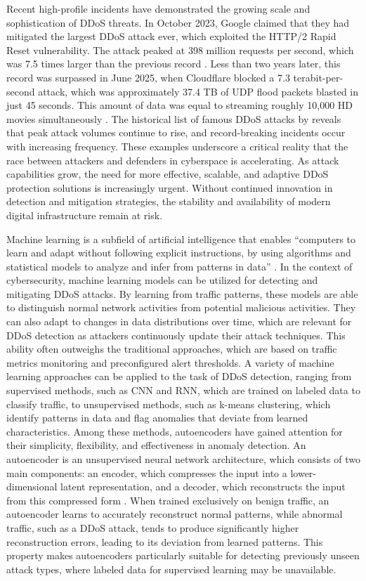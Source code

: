 Recent high-profile incidents have demonstrated the growing scale and sophistication of DDoS threats. In October 2023, Google claimed that they had mitigated the largest DDoS attack ever, which exploited the HTTP/2 Rapid Reset vulnerability. The attack peaked at 398 million requests per second, which was 7.5 times larger than the previous record \citep{google-398-mil}. Less than two years later, this record was surpassed in June 2025, when Cloudflare blocked a 7.3 terabit-per-second attack, which was approximately 37.4 TB of UDP flood packets blasted in just 45 seconds. This amount of data was equal to streaming roughly 10,000 HD movies simultaneously \citep{cloudflare-7-3-tbps}. The historical list of famous DDoS attacks by \cite{cloudflare-ddos-list} reveals that peak attack volumes continue to rise, and record-breaking incidents occur with increasing frequency. These examples underscore a critical reality that the race between attackers and defenders in cyberspace is accelerating. As attack capabilities grow, the need for more effective, scalable, and adaptive DDoS protection solutions is increasingly urgent. Without continued innovation in detection and mitigation strategies, the stability and availability of modern digital infrastructure remain at risk.

Machine learning is a subfield of artificial intelligence that enables “computers to learn and adapt without following explicit instructions, by using algorithms and statistical models to analyze and infer from patterns in data” \citep{oed-machine-learning}. In the context of cybersecurity, machine learning models can be utilized for detecting and mitigating DDoS attacks. By learning from traffic patterns, these models are able to distinguish normal network activities from potential malicious activities. They can also adapt to changes in data distributions over time, which are relevant for DDoS detection as attackers continuously update their attack techniques. This ability often outweighs the traditional approaches, which are based on traffic metrics monitoring and preconfigured alert thresholds. A variety of machine learning approaches can be applied to the task of DDoS detection, ranging from supervised methods, such as CNN and RNN, which are trained on labeled data to classify traffic, to unsupervised methods, such as k-means clustering, which identify patterns in data and flag anomalies that deviate from learned characteristics. Among these methods, autoencoders have gained attention for their simplicity, flexibility, and effectiveness in anomaly detection. An autoencoder is an unsupervised neural network architecture, which consists of two main components: an encoder, which compresses the input into a lower-dimensional latent representation, and a decoder, which reconstructs the input from this compressed form \citep{michelucci2022introductionautoencoders}. When trained exclusively on benign traffic, an autoencoder learns to accurately reconstruct normal patterns, while abnormal traffic, such as a DDoS attack, tends to produce significantly higher reconstruction errors, leading to its deviation from learned patterns. This property makes autoencoders particularly suitable for detecting previously unseen attack types, where labeled data for supervised learning may be unavailable.

